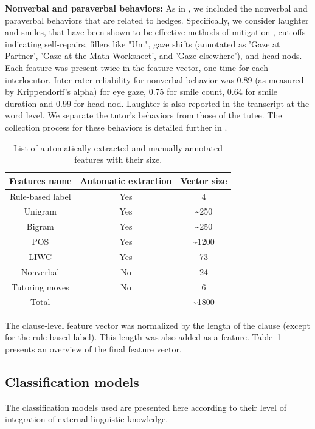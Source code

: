 \documentclass[11pt]{article}
\begin{document}
\noindent\textbf{Nonverbal and paraverbal behaviors:} As in \citet{Goel2019}, we included the nonverbal and paraverbal behaviors that are related to hedges. Specifically, we consider laughter and smiles, that have been shown to be effective methods of mitigation \cite{Warner2014}, cut-offs indicating self-repairs, fillers like "Um", gaze shifts (annotated as 'Gaze at Partner', 'Gaze at the Math Worksheet', and 'Gaze elsewhere'), and head nods. Each feature was present twice in the feature vector, one time for each interlocutor. 
\noindent Inter-rater reliability for nonverbal behavior was 0.89 (as measured by Krippendorff’s alpha) for eye gaze, 0.75 for smile count, 0.64 for smile duration and 0.99 for head nod. Laughter is also reported in the transcript at the word level. We separate the tutor's behaviors from those of the tutee. The collection process for these behaviors is detailed further in \citet{Zhao2016socially}.

\begin{table}[t]
  \tabcolsep=0.15cm
  \small
  \centering
  \begin{tabular}{ccc} \toprule
    Features name & Automatic extraction & Vector size \\ \midrule
    Rule-based label & Yes & 4 \\
    Unigram & Yes & \textasciitilde 250 \\
    Bigram & Yes & \textasciitilde 250\\
    POS & Yes & \textasciitilde 1200 \\
    LIWC & Yes & 73 \\
    Nonverbal & No & 24 \\
    Tutoring moves & No & 6 \\ 
    Total & & \textasciitilde 1800 \\\bottomrule
  \end{tabular}
  \caption{List of automatically extracted and manually annotated features with their size.}
  \label{tab:3}
\end{table}

\noindent The clause-level feature vector was normalized by the length of the clause (except for the rule-based label). This length was also added as a feature. Table~\ref{tab:3} presents an overview of the final feature vector. 
 
\subsection{Classification models}
\label{ssec:CM}
The classification models used are presented here according to their level of integration of external linguistic knowledge.
\end{document}
